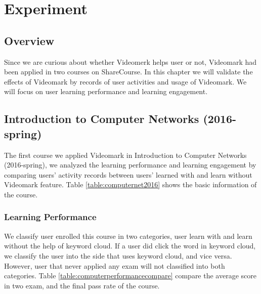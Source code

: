 \chapter{Experiment}\label{cha:Experiment}

\section{Overview}
Since we are curious about whether Videomerk helps user or not, Videomark had been applied in two courses on ShareCourse.
In this chapter we will validate the effects of Videomark by records of user activities and usage of Videomark.
We will focus on user learning performance and learning engagement.

\section{Introduction to Computer Networks (2016-spring)}
The first course we applied Videomark in Introduction to Computer Networks (2016-spring), we analyzed the learning performance and learning engagement by comparing users' activity records between users' learned with and learn without Videomark feature.
Table \ref{table:computernet2016} shows the basic information of the course.
\begin{table}[H]
\centering
\caption{Base Information of Introduction to Computer Network}
\label{table:computernet2016}
\end{table}

\subsection{Learning Performance}
We classify user enrolled this course in two categories, user learn with and learn without the help of keyword cloud.
If a user did click the word in keyword cloud, we classify the user into the side that uses keyword cloud, and vice versa.
However, user that never applied any exam will not classified into both categories.
Table \ref{table:computerperformancecompare} compare the average score in two exam, and the final pass rate of the course.

